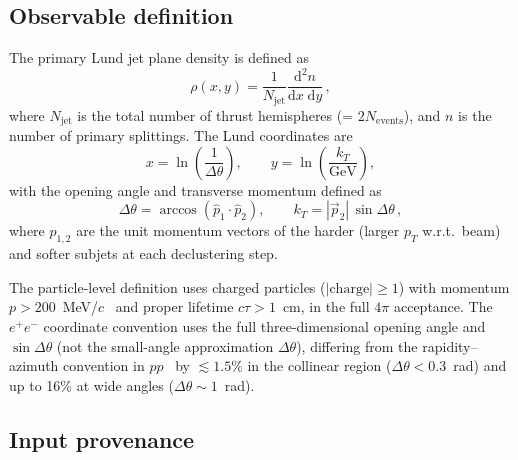 \documentclass[11pt,a4paper]{article}
\begin{document}
\subsection{Observable definition}
\label{sec:obs-def}

The primary Lund jet plane density is defined as
\begin{equation}
  \rho(x, y) = \frac{1}{N_\text{jet}}
  \frac{\mathrm{d}^2 n}{\mathrm{d}x\;\mathrm{d}y}\,,
  \label{eq:rho-def}
\end{equation}
where $N_\text{jet}$ is the total number of thrust hemispheres
(= $2 N_\text{events}$), and $n$ is the number of primary
splittings.  The Lund coordinates are
\begin{equation}
  x = \ln\!\left(\frac{1}{\Delta\theta}\right), \qquad
  y = \ln\!\left(\frac{k_T}{\text{GeV}}\right),
  \label{eq:coords}
\end{equation}
with the opening angle and transverse momentum defined as
\begin{equation}
  \Delta\theta = \arccos\!\left(\hat{p}_1 \cdot \hat{p}_2\right),
  \qquad
  k_T = |\vec{p}_2|\,\sin\Delta\theta\,,
  \label{eq:kt-dtheta}
\end{equation}
where $\hat{p}_{1,2}$ are the unit momentum vectors of the harder
(larger $p_T$ w.r.t.\ beam) and softer subjets at each declustering
step.

The particle-level definition uses charged particles ($|\text{charge}|
\ge 1$) with momentum $p > 200$~MeV/$c$~\cite{ALEPH:1998hhr,ALEPH:1998vtv}
and proper lifetime $c\tau > 1$~cm, in the full $4\pi$ acceptance.
The $e^+e^-$ coordinate convention uses the full three-dimensional
opening angle and $\sin\Delta\theta$ (not the small-angle approximation
$\Delta\theta$), differing from the rapidity--azimuth convention in
$pp$~\cite{Dreyer:2018nbf} by $\lesssim\!1.5\%$ in the collinear
region ($\Delta\theta < 0.3$~rad) and up to 16\% at wide angles
($\Delta\theta \sim 1$~rad).

\subsection{Input provenance}
\label{sec:provenance}
\end{document}
